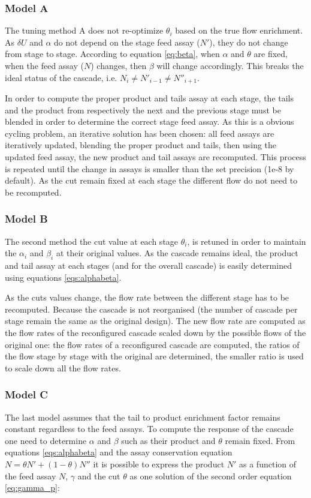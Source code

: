 \subsubsection{Model A}
The tuning method A does not re-optimize $\theta_i$ based on the true flow
enrichment. As $\delta U$ and $\alpha$ do not depend on the stage feed assay
($N'$), they do not change from stage to stage. According to equation
\eqref{eq:beta}, when $\alpha$ and $\theta$ are fixed, when the feed assay ($N$)
changes, then $\beta$ will change accordingly.  This breaks the ideal status of
the cascade, i.e.  $N_{i} \neq N'_{i-1} \neq N''_{i+1}$.

In order to compute the proper product and tails assay at each stage, the
tails and the product from respectively the next and the previous stage must be
blended in order to determine the correct stage feed assay. As this is a obvious
cycling problem, an iterative solution has been chosen: all feed assays are
iteratively updated, blending the proper product and tails, then using the
updated feed assay, the new product and tail assays are recomputed. This process
is repeated until the change in assays is smaller than the set precision (1e-8
by default).
As the cut remain fixed at each stage the different flow do not need to be
recomputed.


\subsubsection{Model B}

The second method the cut value at each stage $\theta_i$, is retuned in order to
maintain the $\alpha_i$ and $\beta_i$ at their original values. As the cascade
remains ideal, the product and tail assay at each stages (and for the overall
cascade) is easily determined using equations \eqref{eqs:alphabeta}.

As the cuts values change, the flow rate between the different stage has to be
recomputed. Because the cascade is not reorganised (the number of cascade per
stage remain the same as the original design). The new flow rate are computed as
the flow rates of the reconfigured cascade scaled down by the possible
flows of the original one: the flow rates of a reconfigured cascade are
computed, the ratios of the flow stage by stage with the original are determined,
the smaller ratio is used to scale down all the flow rates.

\subsubsection{Model C}
The last model assumes that the tail to product enrichment factor remains
constant regardless to the feed assays. To compute the response of the cascade
one need to determine $\alpha$ and $\beta$ such as their product and
$\theta$ remain fixed. 
From equations \eqref{eqs:alphabeta} and the assay conservation equation $N =
\theta N' + (1-\theta)N''$ it is possible to express the product $N'$ as a function of
the feed assay $N$, $\gamma$ and the cut $\theta$ as one solution of the second
order equation \eqref{eq:gamma_p}:


